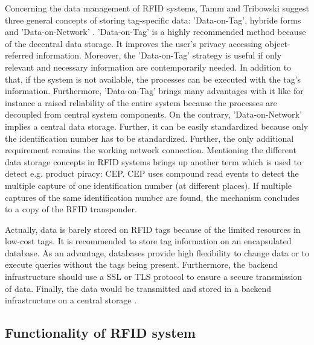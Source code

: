 Concerning the data management of RFID systems, Tamm and Tribowski suggest three general concepts of storing tag-specific data: 'Data-on-Tag', hybride forms and 'Data-on-Network' \cite[p.22 ff.]{fokus}. 'Data-on-Tag' is a highly recommended method because of the decentral data storage. It improves the user's privacy accessing object-referred information. Moreover, the 'Data-on-Tag' strategy is useful if only relevant and necessary information are contemporarily needed. In addition to that, if the system is not available, the processes can be executed with the tag's information.
Furthermore, 'Data-on-Tag' brings many advantages with it like for instance a raised reliability of the entire system because the processes are decoupled from central system components. 
On the contrary, 'Data-on-Network' implies a central data storage. Further, it can be easily standardized because only the identification number has to be standardized. Further, the only additional requirement remains the working network connection. Mentioning the different data storage concepts in RFID systems brings up another term which is used to detect e.g. product piracy: \ac{CEP}. CEP uses compound read events to detect the multiple capture of one identification number (at different places). If multiple captures of the same identification number are found, the mechanism concludes to a copy of the RFID transponder. 

Actually, data is barely stored on RFID tags because of the limited resources in low-cost tags. It is recommended \cite{henrici} to store tag information on an encapsulated database. As an advantage, databases provide high flexibility to change data or to execute queries without the tags being present. Furthermore, the backend infrastructure should use a \ac{SSL} or \ac{TLS} protocol to ensure a secure transmission of data. Finally, the data would be transmitted and stored in a backend infrastructure on a central storage \cite{henrici}.

\subsection{Functionality of RFID system} \label{chipless}

